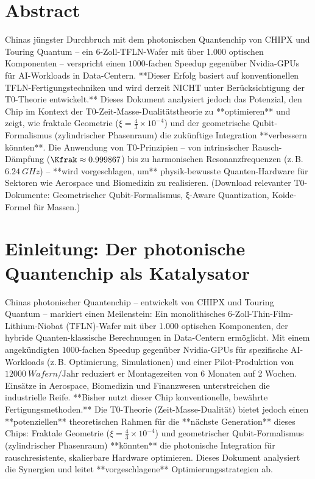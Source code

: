 \section*{Abstract}
		Chinas jüngster Durchbruch mit dem photonischen Quantenchip von CHIPX und Touring Quantum – ein 6-Zoll-TFLN-Wafer mit über 1.000 optischen Komponenten – verspricht einen $1000$-fachen Speedup gegenüber Nvidia-GPUs für AI-Workloads in Data-Centern. **Dieser Erfolg basiert auf konventionellen TFLN-Fertigungstechniken und wird derzeit NICHT unter Berücksichtigung der T0-Theorie entwickelt.** Dieses Dokument analysiert jedoch das Potenzial, den Chip im Kontext der T0-Zeit-Masse-Dualitätstheorie zu **optimieren** und zeigt, wie fraktale Geometrie ($\xi = \frac{4}{3} \times 10^{-4}$) und der geometrische Qubit-Formalismus (zylindrischer Phasenraum) die zukünftige Integration **verbessern könnten**. Die Anwendung von T0-Prinzipien – von intrinsischer Rausch-Dämpfung ($\Kfrak \approx 0.999867$) bis zu harmonischen Resonanzfrequenzen (z.\,B. $\SI{6.24}{GHz}$) – **wird vorgeschlagen, um** physik-bewusste Quanten-Hardware für Sektoren wie Aerospace und Biomedizin zu realisieren.
		(Download relevanter T0-Dokumente: Geometrischer Qubit-Formalismus, ξ-Aware Quantization, Koide-Formel für Massen.)

	
	
	\section{Einleitung: Der photonische Quantenchip als Katalysator}
	
	Chinas photonischer Quantenchip – entwickelt von CHIPX und Touring Quantum – markiert einen Meilenstein: Ein monolithisches 6-Zoll-Thin-Film-Lithium-Niobat (TFLN)-Wafer mit über 1.000 optischen Komponenten, der hybride Quanten-klassische Berechnungen in Data-Centern ermöglicht. Mit einem angekündigten $1000$-fachen Speedup gegenüber Nvidia-GPUs für spezifische AI-Workloads (z.\,B. Optimierung, Simulationen) und einer Pilot-Produktion von $\SI{12000}{Wafern}/\text{Jahr}$ reduziert er Montagezeiten von 6 Monaten auf 2 Wochen. Einsätze in Aerospace, Biomedizin und Finanzwesen unterstreichen die industrielle Reife. **Bisher nutzt dieser Chip konventionelle, bewährte Fertigungsmethoden.** Die T0-Theorie (Zeit-Masse-Dualität) bietet jedoch einen **potenziellen** theoretischen Rahmen für die **nächste Generation** dieses Chips: Fraktale Geometrie ($\xi = \frac{4}{3} \times 10^{-4}$) und geometrischer Qubit-Formalismus (zylindrischer Phasenraum) **könnten** die photonische Integration für rauschresistente, skalierbare Hardware optimieren. Dieses Dokument analysiert die Synergien und leitet **vorgeschlagene** Optimierungsstrategien ab.
	
